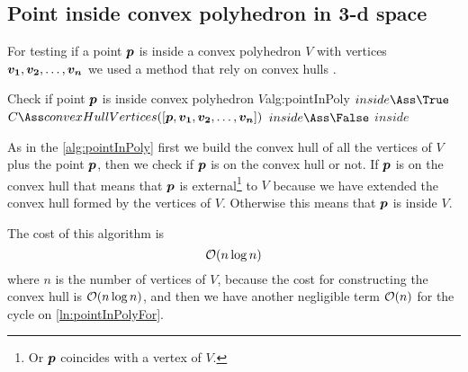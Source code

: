 \documentclass[dissertation.tex]{subfiles}
\begin{document}
\subsection{Point inside convex polyhedron in 3-d space}
For testing if a point $\boldsymbol{p}$ is inside a convex polyhedron $V$ with
vertices $\boldsymbol{v_1},\boldsymbol{v_2},\dots,\boldsymbol{v_n}$ we used a method that rely
on convex hulls \cite{deberg}\cite{schneider}.

\begin{algo}{Check if point $\boldsymbol{p}$ is inside convex polyhedron $V$}{alg:pointInPoly}
  \State $inside\Ass\True$
  \State $C\Ass convexHullVertices([\ve{p},\ve{v_1},\ve{v_2},\dots,\ve{v_n}])$
  \label{ln:pointInPolyFor}
  \State $inside\Ass\False$
  \State \Break
  \EndIf
  \EndFor
  \State\Return $inside$
  \EndFunction
\end{algo}
As in the \cref{alg:pointInPoly} first we build the convex hull of all
the vertices of $V$ plus the point $\boldsymbol{p}$, then we check if $\boldsymbol{p}$
is on the convex hull or not. If $\boldsymbol{p}$ is on the convex hull that
means that $\boldsymbol{p}$ is external\footnote{Or $\boldsymbol{p}$ coincides with a
  vertex of $V$.} to $V$ because we have extended the convex hull
formed by the vertices of $V$. Otherwise this means that $\boldsymbol{p}$ is
inside $V$.

The cost of this algorithm is
\begin{equation*}
  \mathcal{O}(n\log n)
\end{equation*}
where $n$ is the number of vertices of $V$, because the cost for
constructing the convex hull is \cite{deberg} $\mathcal{O}(n\log n)$, and
then we have another negligible term $\mathcal{O}(n)$ for the cycle on \cref{ln:pointInPolyFor}.
\end{document}
